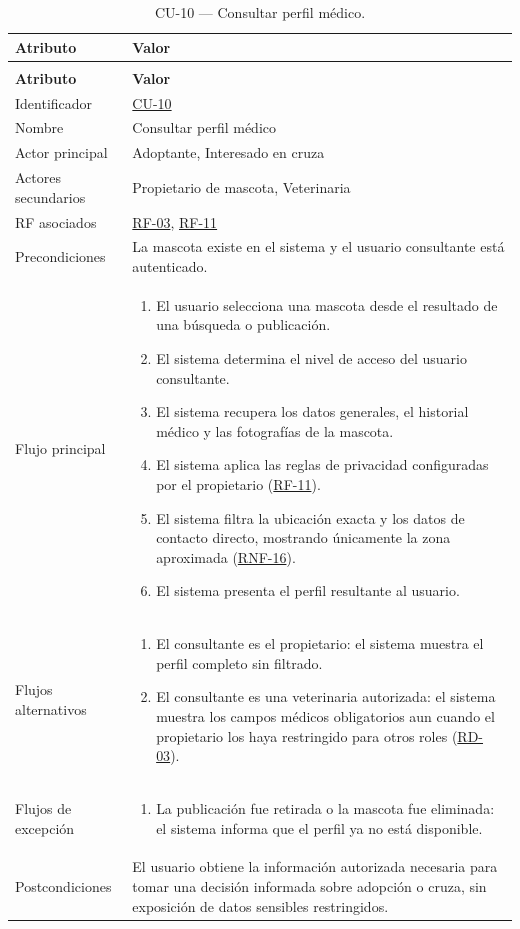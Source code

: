 \documentclass[journal,onecolumn]{IEEEtran}
\makeatletter
\newenvironment{atributos}[2]{%
	\small
	\begin{longtable}{@{}>{\raggedright\arraybackslash}p{4.2cm} >{\raggedright\arraybackslash}p{11.2cm}@{}}
		\caption{#2}\label{tab:#1}\\
		\toprule
		\textbf{Atributo} & \textbf{Valor} \\
		\midrule
		\endfirsthead
		\multicolumn{2}{@{}l}{\small\itshape (continuación)}\\
		\toprule
		\textbf{Atributo} & \textbf{Valor} \\
		\midrule
		\endhead
		\bottomrule
		\endlastfoot
	}{%
	\end{longtable}
	\normalsize
}
\makeatother
\begin{document}
	\begin{atributos}{CU-10}{CU-10 --- Consultar perfil médico.}
		Identificador & \hyperref[tab:CU-10]{CU-10} \\
		Nombre & Consultar perfil médico \\
		Actor principal & Adoptante, Interesado en cruza \\
		Actores secundarios & Propietario de mascota, Veterinaria \\
		RF asociados & \hyperref[tab:RF-03]{RF-03}, \hyperref[tab:RF-11]{RF-11} \\
		Precondiciones & La mascota existe en el sistema y el usuario consultante está autenticado. \\
		Flujo principal &
		\begin{enumerate}[leftmargin=*, nosep]
			\item El usuario selecciona una mascota desde el resultado de una búsqueda o publicación.
			\item El sistema determina el nivel de acceso del usuario consultante.
			\item El sistema recupera los datos generales, el historial médico y las fotografías de la mascota.
			\item El sistema aplica las reglas de privacidad configuradas por el propietario (\hyperref[tab:RF-11]{RF-11}).
			\item El sistema filtra la ubicación exacta y los datos de contacto directo, mostrando únicamente la zona aproximada (\hyperref[tab:RNF-16]{RNF-16}).
			\item El sistema presenta el perfil resultante al usuario.
		\end{enumerate} \\
		Flujos alternativos &
		\begin{enumerate}[leftmargin=*, nosep]
			\item[2.1] El consultante es el propietario: el sistema muestra el perfil completo sin filtrado.
			\item[2.2] El consultante es una veterinaria autorizada: el sistema muestra los campos médicos obligatorios aun cuando el propietario los haya restringido para otros roles (\hyperref[tab:RD-03]{RD-03}).
		\end{enumerate} \\
		Flujos de excepción &
		\begin{enumerate}[leftmargin=*, nosep]
			\item[3.1] La publicación fue retirada o la mascota fue eliminada: el sistema informa que el perfil ya no está disponible.
		\end{enumerate} \\
		Postcondiciones & El usuario obtiene la información autorizada necesaria para tomar una decisión informada sobre adopción o cruza, sin exposición de datos sensibles restringidos. \\
	\end{atributos}
	
\end{document}
